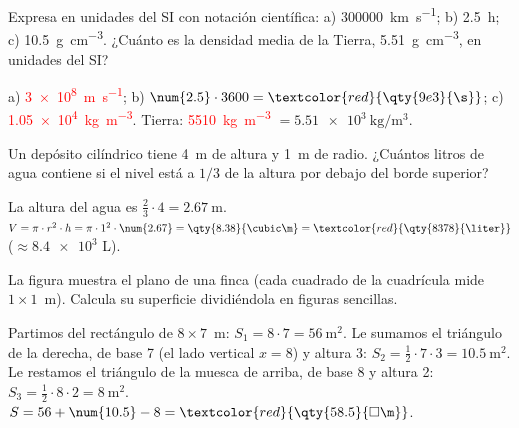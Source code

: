 \begin{exercise}
    Expresa en unidades del SI con notación científica: a) \qty{300000}{\km\per\s}; b) \qty{2.5}{\hour}; c) \qty{10.5}{\gram\per\cubic\cm}. ¿Cuánto es la densidad media de la Tierra, \qty{5.51}{\gram\per\cubic\cm}, en unidades del SI?
    \begin{solu}
        a) \textcolor{red}{\qty{3e8}{\m\per\s}}; b) \(\num{2.5} \cdot 3600 = \textcolor{red}{\qty{9e3}{\s}}\); c) \textcolor{red}{\qty{1.05e4}{\kg\per\cubic\m}}. Tierra: \textcolor{red}{\qty{5510}{\kg\per\cubic\m}} \(= \qty{5.51e3}{\kg\per\cubic\m}\).
    \end{solu}
\end{exercise}

\begin{exercise}
    Un depósito cilíndrico tiene \qty{4}{\m} de altura y \qty{1}{\m} de radio. ¿Cuántos litros de agua contiene si el nivel está a \(1/3\) de la altura por debajo del borde superior?
    \begin{solu}
        La altura del agua es \(\frac{2}{3} \cdot 4 = \qty{2.67}{\m}\). \(V = \pi \cdot r^2 \cdot h = \pi \cdot 1^2 \cdot \num{2.67} = \qty{8.38}{\cubic\m} = \textcolor{red}{\qty{8378}{\liter}}\) (\(\approx \num{8.4e3}\) L).
    \end{solu}
\end{exercise}

\begin{exercise}
    La figura muestra el plano de una finca (cada cuadrado de la cuadrícula mide \(1 \times 1\)~\unit{\m}). Calcula su superficie dividiéndola en figuras sencillas.
    \begin{center}
    \end{center}
    \begin{solu}
        Partimos del rectángulo de \(8 \times 7\)~\unit{\m}: \(S_1 = 8 \cdot 7 = \qty{56}{\square\m}\).
        Le sumamos el triángulo de la derecha, de base 7 (el lado vertical \(x = 8\)) y altura 3: \(S_2 = \frac{1}{2} \cdot 7 \cdot 3 = \qty{10.5}{\square\m}\).
        Le restamos el triángulo de la muesca de arriba, de base 8 y altura 2: \(S_3 = \frac{1}{2} \cdot 8 \cdot 2 = \qty{8}{\square\m}\).
        \(S = 56 + \num{10.5} - 8 = \textcolor{red}{\qty{58.5}{\square\m}}\).
    \end{solu}
\end{exercise}

